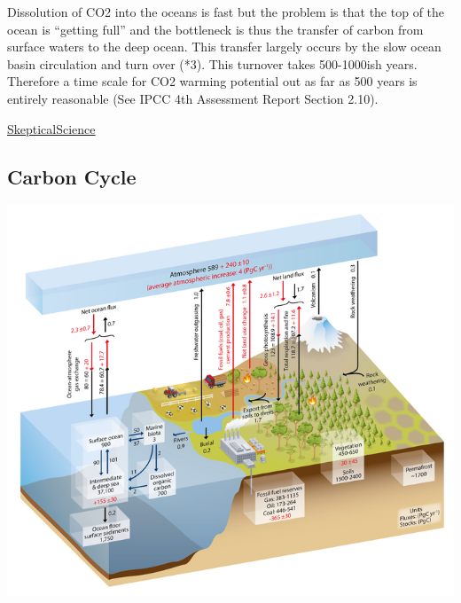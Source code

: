 \documentclass[
]{book}
\begin{document}
Dissolution of CO2 into the oceans is fast but the problem is that the top of the ocean is ``getting full'' and the bottleneck is thus the transfer of carbon from surface waters to the deep ocean. This transfer largely occurs by the slow ocean basin circulation and turn over (*3). This turnover takes 500-1000ish years. Therefore a time scale for CO2 warming potential out as far as 500 years is entirely reasonable (See IPCC 4th Assessment Report Section 2.10).

\href{https://skepticalscience.com/argument.php?p=3\&t=154\&\&a=80}{SkepticalScience}

\hypertarget{carbon-cycle}{%
\subsection{Carbon Cycle}\label{carbon-cycle}}

\includegraphics{fig/carbon_cycle_WG1AR5ch6.jpg}
\end{document}
